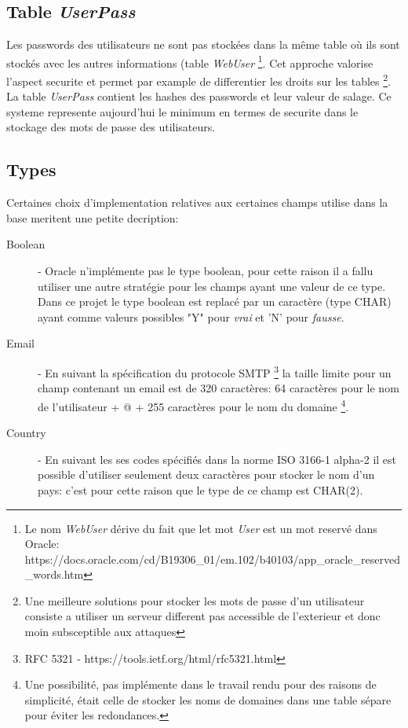 \documentclass[twoside,openright,a4paper,11pt,french]{article}
\begin{document}
\subsection{Table {\it UserPass}}
Les passwords des utilisateurs ne sont pas stockées dans la même table où ils
sont stockés  avec les autres informations (table {\it WebUser}
\footnote{Le nom {\it WebUser} dérive du fait que let mot {\it User} est un mot reservé dans Oracle:
https://docs.oracle.com/cd/B19306\_01/em.102/b40103/app\_oracle\_reserved\_words.htm}.
Cet approche valorise l'aspect securite et permet par
example de differentier les droits sur les tables
\footnote{Une meilleure solutions pour stocker les mots de passe d'un
utilisateur consiste a utiliser un serveur different pas accessible de
l'exterieur et donc  moin subsceptible aux attaques}.
La table {\it UserPass} contient les hashes des passwords et leur valeur de
salage.  Ce systeme represente aujourd'hui le minimum en termes de securite
dans le stockage des mots de passe des utilisateurs.


\subsection{Types}
Certaines choix d'implementation relatives aux certaines champs utilise dans la
base meritent une petite decription:


\begin{description}
\item[Boolean] - 
Oracle n'implémente pas le type boolean, pour cette raison il a fallu utiliser
une autre stratégie pour les champs ayant une valeur de ce type.  Dans ce
projet le type boolean est replacé par un caractère (type CHAR) ayant comme
valeurs possibles "Y" pour {\it vrai} et 'N' pour {\it fausse}.

\item[Email] - En suivant la spécification du protocole SMTP
\footnote{RFC 5321 - https://tools.ietf.org/html/rfc5321.html}
la taille limite pour un champ contenant un email est de 320 caractères: 64
caractères pour le nom de l'utilisateur + @ + 255 caractères pour le nom du
domaine \footnote{ Une possibilité, pas implémente dans le travail rendu pour
des raisons de simplicité, était celle de stocker les noms de domaines dans une
table sépare pour éviter les redondances.}.

\item[Country] - En suivant les ses codes spécifiés dans la norme ISO 3166-1
alpha-2 il est possible d'utiliser seulement deux caractères pour stocker le
nom d'un pays: c'est pour cette raison que le type de ce champ est CHAR(2).

\end{description}
\end{document}
